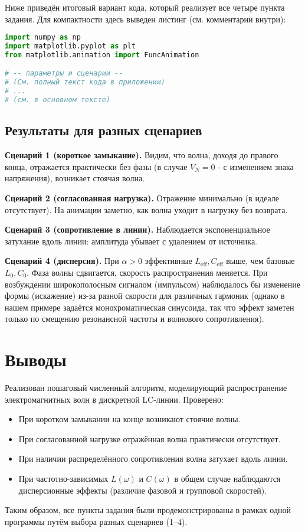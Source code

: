 \documentclass[12pt]{article}
\begin{document}
Ниже приведён итоговый вариант кода, который реализует все четыре пункта задания. 
Для компактности здесь выведен листинг (см. комментарии внутри):

\begin{lstlisting}[language=Python, basicstyle=\footnotesize\ttfamily]
import numpy as np
import matplotlib.pyplot as plt
from matplotlib.animation import FuncAnimation

# -- параметры и сценарии --
# (См. полный текст кода в приложении)
# ...
# (см. в основном тексте)
\end{lstlisting}

\subsection{Результаты для разных сценариев}

\textbf{Сценарий 1 (короткое замыкание).}  
Видим, что волна, доходя до правого конца, отражается практически без фазы (в случае $V_N=0$ - с изменением знака напряжения), возникает стоячая волна.

\textbf{Сценарий 2 (согласованная нагрузка).}  
Отражение минимально (в идеале отсутствует). На анимации заметно, как волна уходит в нагрузку без возврата.

\textbf{Сценарий 3 (сопротивление в линии).}  
Наблюдается экспоненциальное затухание вдоль линии: амплитуда убывает с удалением от источника.

\textbf{Сценарий 4 (дисперсия).}  
При $\alpha > 0$ эффективные $L_{\mathrm{eff}}, C_{\mathrm{eff}}$ выше, чем базовые $L_0, C_0$. Фаза волны сдвигается, скорость распространения меняется. При возбуждении широкополосным сигналом (импульсом) наблюдалось бы изменение формы (искажение) из-за разной скорости для различных гармоник (однако в нашем примере задаётся монохроматическая синусоида, так что эффект заметен только по смещению резонансной частоты и волнового сопротивления).

\section{Выводы}

Реализован пошаговый численный алгоритм, моделирующий распространение электромагнитных волн в дискретной LC-линии. Проверено:
\begin{itemize}
  \item При коротком замыкании на конце возникают стоячие волны.
  \item При согласованной нагрузке отражённая волна практически отсутствует.
  \item При наличии распределённого сопротивления волна затухает вдоль линии.
  \item При частотно-зависимых $L(\omega)$ и $C(\omega)$ в общем случае наблюдаются дисперсионные эффекты (различие фазовой и групповой скоростей).
\end{itemize}

Таким образом, все пункты задания были продемонстрированы в рамках одной программы путём выбора разных сценариев (1--4).
\end{document}
